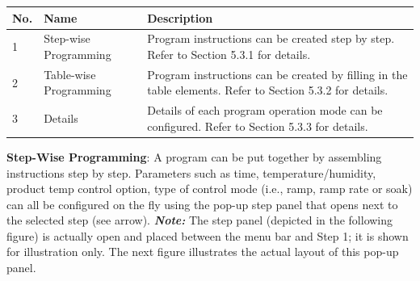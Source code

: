 \begin{longtable}[]{@{}lll@{}}
\toprule
\begin{minipage}[b]{0.04\columnwidth}\raggedright
No.\strut
\end{minipage} & \begin{minipage}[b]{0.23\columnwidth}\raggedright
Name\strut
\end{minipage} & \begin{minipage}[b]{0.65\columnwidth}\raggedright
Description\strut
\end{minipage}\tabularnewline
\midrule
\endhead
\begin{minipage}[t]{0.04\columnwidth}\raggedright
1\strut
\end{minipage} & \begin{minipage}[t]{0.23\columnwidth}\raggedright
Step-wise Programming\strut
\end{minipage} & \begin{minipage}[t]{0.65\columnwidth}\raggedright
Program instructions can be created step by step. Refer to Section 5.3.1
for details.\strut
\end{minipage}\tabularnewline
\begin{minipage}[t]{0.04\columnwidth}\raggedright
2\strut
\end{minipage} & \begin{minipage}[t]{0.23\columnwidth}\raggedright
Table-wise Programming\strut
\end{minipage} & \begin{minipage}[t]{0.65\columnwidth}\raggedright
Program instructions can be created by filling in the table elements.
Refer to Section 5.3.2 for details.\strut
\end{minipage}\tabularnewline
\begin{minipage}[t]{0.04\columnwidth}\raggedright
3\strut
\end{minipage} & \begin{minipage}[t]{0.23\columnwidth}\raggedright
Details\strut
\end{minipage} & \begin{minipage}[t]{0.65\columnwidth}\raggedright
Details of each program operation mode can be configured. Refer to
Section 5.3.3 for details.\strut
\end{minipage}\tabularnewline
\bottomrule
\end{longtable}

\textbf{Step-Wise Programming}: A program can be put together by
assembling instructions step by step. Parameters such as time,
temperature/humidity, product temp control option, type of control mode
(i.e., ramp, ramp rate or soak) can all be configured on the fly using
the pop-up step panel that opens next to the selected step (see arrow).
\textbf{\emph{Note:}} The step panel (depicted in the following figure)
is actually open and placed between the menu bar and Step 1; it is shown
for illustration only. The next figure illustrates the actual layout of
this pop-up panel.

